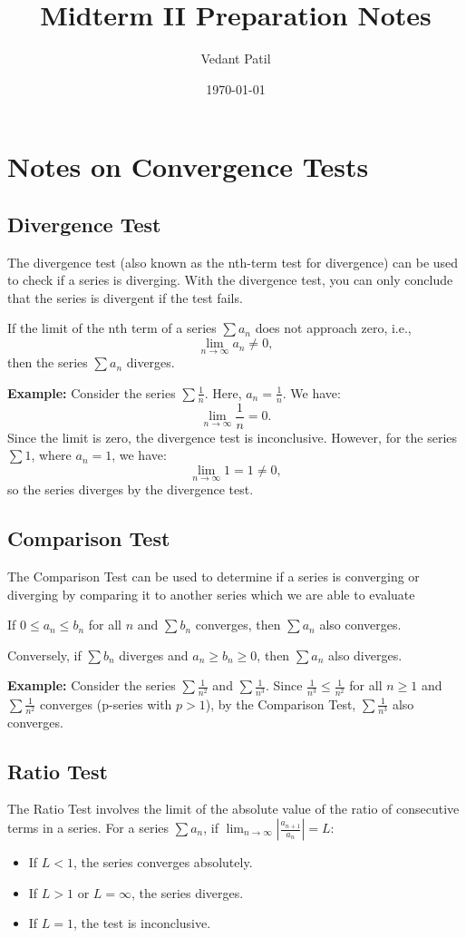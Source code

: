 \documentclass{article}
\begin{document}
\title{Midterm II Preparation Notes}
\author{Vedant Patil}
\date{\today}
\maketitle

\section*{Notes on Convergence Tests}

\subsection*{Divergence Test}
The divergence test (also known as the nth-term test for divergence) can be used to check if a series is diverging. With the divergence test, you can only conclude that the series is divergent if the test fails.

If the limit of the nth term of a series \(\sum a_n\) does not approach zero, i.e.,
\[
\lim_{n \to \infty} a_n \neq 0,
\]
then the series \(\sum a_n\) diverges.

\textbf{Example:}
Consider the series \(\sum \frac{1}{n}\). Here, \(a_n = \frac{1}{n}\). We have:
\[
\lim_{n \to \infty} \frac{1}{n} = 0.
\]
Since the limit is zero, the divergence test is inconclusive. However, for the series \(\sum 1\), where \(a_n = 1\), we have:
\[
\lim_{n \to \infty} 1 = 1 \neq 0,
\]
so the series diverges by the divergence test.

\subsection*{Comparison Test}
The Comparison Test can be used to determine if a series is converging or diverging by comparing it to another series which we are able to evaluate 

If \(0 \leq a_n \leq b_n\) for all \(n\) and \(\sum b_n\) converges, then \(\sum a_n\) also converges.

Conversely, if \(\sum b_n\) diverges and \(a_n \geq b_n \geq 0\), then \(\sum a_n\) also diverges.

\textbf{Example:}
Consider the series \(\sum \frac{1}{n^2}\) and \(\sum \frac{1}{n^3}\). Since \(\frac{1}{n^3} \leq \frac{1}{n^2}\) for all \(n \geq 1\) and \(\sum \frac{1}{n^2}\) converges (p-series with \(p > 1\)), by the Comparison Test, \(\sum \frac{1}{n^3}\) also converges.

\subsection*{Ratio Test}
The Ratio Test involves the limit of the absolute value of the ratio of consecutive terms in a series. For a series \(\sum a_n\), if \(\lim_{n \to \infty} \left| \frac{a_{n+1}}{a_n} \right| = L\):
\begin{itemize}
    \item If \(L < 1\), the series converges absolutely.
    \item If \(L > 1\) or \(L = \infty\), the series diverges.
    \item If \(L = 1\), the test is inconclusive.
\end{itemize}
\end{document}
